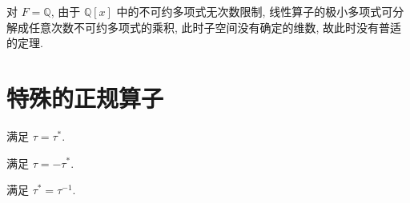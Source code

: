 \documentclass{note}
\begin{document}
对 $F=\mathbb{Q}$, 由于 $\mathbb{Q}[x]$ 中的不可约多项式无次数限制, 线性算子的极小多项式可分解成任意次数不可约多项式的乘积, 此时子空间没有确定的维数, 故此时没有普适的定理.

\section{特殊的正规算子}
\begin{df}[自伴随(/厄米)算子]
    满足 $\tau=\tau^*$.
\end{df}

\begin{df}
    满足 $\tau=-\tau^*$.
\end{df}

\begin{df}[酉(/幺正)算子]
    满足 $\tau^*=\tau^{-1}$.
\end{df}
\end{document}
